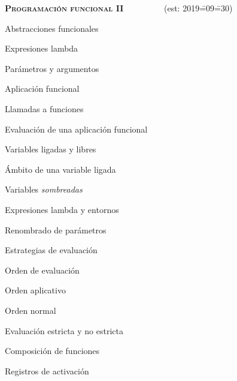 \begin{longenum}
\begin{longenum}
\begin{longenum}
        \end{longenum}
    \end{longenum}
    \item \textbf{\textsc{Programación funcional II}} \ \ \ \ \ \ \ \ \ (est: 2019\==09\==30)
    \begin{longenum}
        \item Abstracciones funcionales
        \begin{longenum}
            \item Expresiones lambda
            \begin{longenum}
                \item Parámetros y argumentos
                \item Aplicación funcional
                \begin{longenum}
                    \item Llamadas a funciones
                    \item Evaluación de una aplicación funcional
                \end{longenum}
                \item Variables ligadas y libres
                \item Ámbito de una variable ligada
                \item Variables \textit{sombreadas}
                \item Expresiones lambda y entornos
                \item Renombrado de parámetros
            \end{longenum}
            \item Estrategias de evaluación
            \begin{longenum}
                \item Orden de evaluación
                \begin{longenum}
                    \item Orden aplicativo
                    \item Orden normal
                \end{longenum}
                \item Evaluación estricta y no estricta
            \end{longenum}
            \item Composición de funciones
            \item Registros de activación
        \end{longenum}

\end{longenum}
\end{longenum}
